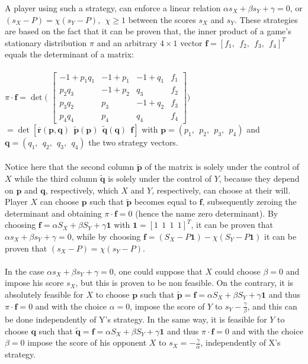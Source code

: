 \documentclass[12pt]{article}
\begin{document}
A player using such a strategy, can enforce a linear relation $\alpha s_X+\beta s_Y+\gamma=0$, or $(s_X-P)=\chi(s_Y-P), \ \ \chi\ge 1$ between the scores $s_X$ and $s_Y$. These strategies are based on the fact that it can be proven that, the inner product of a game's stationary distribution $\pi$ and an arbitrary $4\times 1$ vector $\mathbf{f}=[f_1,\ \ f_2,\ \ f_3,\ \ f_4]^T$ equals the determinant of a matrix:
\\\\
$\pi \cdot \mathbf{f}=\det\Big($
$
 \begin{bmatrix}
-1+p_1q_1 & -1+p_1 & -1+q_1 & f_1 \\
p_2q_3 & -1+p_2 & q_3 & f_2 \\
p_3q_2 & p_3 & -1+q_2 & f_3 \\
p_4q_4 & p_4 & q_4 & f_4 
\end{bmatrix} 
\Big)
$
$=\det[\overline{\mathbf{r}}(\mathbf{p},\mathbf{q})\ \ \tilde{\mathbf{p}}(\mathbf{p})\ \ \tilde{\mathbf{q}}(\mathbf{q})\ \ \mathbf{f}]$ with $\mathbf{p}=(p_1,\ \ p_2,\ \ p_3,\ \ p_4)$ and $\mathbf{q}=(q_1,\ \ q_2,\ \ q_3,\ \ q_4)$ the two strategy vectors.
\\\\
Notice here that the second column $\tilde{\mathbf{p}}$ of the matrix is solely under the control of $X$ while the third column $\tilde{\mathbf{q}}$ is solely under the control of $Y$, because they depend on $\mathbf{p}$ and $\mathbf{q}$, respectively, which $X$ and $Y$, respectively, can choose at their will. Player $X$ can choose $\mathbf{p}$ such that $\tilde{\mathbf{\mathbf{p}}}$ becomes equal to $\mathbf{f}$, subsequently zeroing the determinant and obtaining $\pi\cdot \mathbf{f}=0$ (hence the name zero determinant). By choosing $\mathbf{f}=\alpha S_X+\beta S_Y+\gamma\mathbf{1}$ with $\mathbf{1}=[1\ \ 1\ \ 1\ \ 1]^T$, it can be proven that $\alpha s_X+\beta s_Y+\gamma=0$, while by choosing $\mathbf{f}=(S_X-P\mathbf{1})-\chi(S_Y-P\mathbf{1})$ it can be proven that $(s_X-P)=\chi(s_Y-P)$.
\\\\
In the case $\alpha s_X+\beta s_Y+\gamma=0$, one could suppose that $X$ could
choose $\beta=0$ and impose his score $s_X$, but this is proven to be non feasible. On the contrary, it is absolutely feasible for $X$ to choose $\mathbf{p}$ such that $\tilde{\mathbf{p}}=\mathbf{f}=\alpha S_X+\beta S_Y+\gamma \mathbf{1}$ and thus $\pi \cdot \mathbf{f}=0$ and with the choice $\alpha=0$, impose the score of $Y$ to $s_Y-\frac{\gamma}{\beta}$, and this can be done independently of Y's strategy. In the same way, it is feasible for $Y$ to choose $\mathbf{q}$ such that $\tilde{\mathbf{q}}=\mathbf{f}=\alpha S_X+\beta S_Y+\gamma\mathbf{1}$ and thus $\pi \cdot \mathbf{f}=0$ and with the choice $\beta=0$ impose the score of his opponent $X$ to $s_X=-\frac{\gamma}{\alpha}$, independently of X's strategy.
\end{document}
